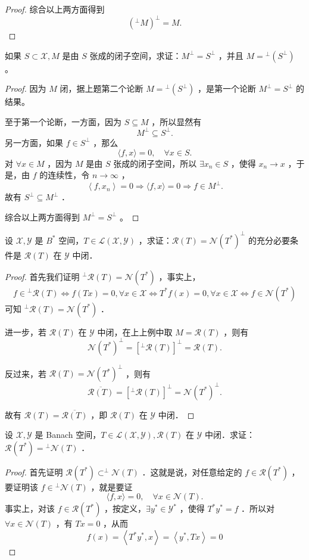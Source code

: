 \documentclass[lang=cn,newtx,10pt,scheme=chinese,thmcnt=chapter]{elegantbook}
\begin{document}
\begin{problemset}
\begin{proof}
综合以上两方面得到
$$
\left({ }^{\perp}M\right)^{\perp} =M .
$$


\end{proof}
\item  如果 $S \subset \mathcal{X}, M$ 是由 $S$ 张成的闭子空间，求证：$M^{\perp}=S^{\perp}$ ，并且 $M={ }^{\perp}\left(S^{\perp}\right)$ 。
\begin{proof}
    因为 $M$ 闭，据上题第二个论断 $M={ }^{\perp}\left(S^{\perp}\right)$ ，是第一个论断 $M^{\perp}=S^{\perp}$ 的结果。

至于第一个论断，一方面，因为 $S \subseteq M$ ，所以显然有
$$
M^{\perp} \subseteq S^{\perp} .
$$
另一方面，如果 $f \in S^{\perp}$ ，那么
$$
\langle f, x\rangle=0, \quad \forall x \in S .
$$
对 $\forall x \in M$ ，因为 $M$ 是由 $S$ 张成的闭子空间，所以 $\exists x_n \in S$ ，使得 $x_n \rightarrow x$ ，于是，由 $f$ 的连续性，令 $n \rightarrow \infty$ ，
$$
\left\langle f, x_n\right\rangle=0 \Longrightarrow\langle f, x\rangle=0 \Longrightarrow f \in M^{\perp} .
$$
故有 $S^{\perp} \subseteq M^{\perp}$ ．

综合以上两方面得到 $M^{\perp}=S^{\perp}$ 。
\end{proof}
\item 设 $\mathcal{X}, \mathcal{Y}$ 是 $B^*$ 空间，$T \in \mathcal{L}(\mathcal{X}, \mathcal{Y})$ ，求证：$\mathcal{R}(T)= \mathcal{N}\left(T^*\right)^{\perp}$ 的充分必要条件是 $\mathcal{R}(T)$ 在 $\mathcal{Y}$ 中闭．
\begin{proof}
    首先我们证明 ${ }^{\perp} \mathcal{R}(T)=\mathcal{N}\left(T^*\right)$ ，事实上，
\[f\in {}^\perp \mathcal{R}(T)\Leftrightarrow f (Tx)=0,\forall x\in \mathcal{X}\Leftrightarrow T^*f(x)=0,\forall x\in \mathcal{X}\Leftrightarrow f\in \mathcal{N}(T^*)\]
可知 ${ }^\perp \mathcal{R}(T)=\mathcal{N}\left(T^*\right)$ ．

进一步，若 $\mathcal{R}(T)$ 在 $\mathcal{Y}$ 中闭，在上上例中取 $M=\mathcal{R}(T)$ ，则有
$$
\mathcal{N}\left(T^*\right)^{\perp}=\left[{ }^{\perp} \mathcal{R}(T)\right]^{\perp}=\mathcal{R}(T) .
$$


反过来，若 $\mathcal{R}(T)=\mathcal{N}\left(T^*\right)^{\perp}$ ，则有
$$
\overline{\mathcal{R}(T)}=\left[{ }^{\perp} \mathcal{R}(T)\right]^{\perp}=\mathcal{N}\left(T^*\right)^{\perp} .
$$


故有 $\mathcal{R}(T)=\overline{\mathcal{R}(T)}$ ，即 $\mathcal{R}(T)$ 在 $\mathcal{Y}$ 中闭．
\end{proof}
\item 设 $\mathcal{X}, \mathcal{Y}$ 是 Banach 空间，$T \in \mathcal{L}(\mathcal{X}, \mathcal{Y}), \mathcal{R}(T)$ 在 $\mathcal{Y}$ 中闭．求证：$\mathcal{R}\left(T^*\right)={ }^{\perp} \mathcal{N}(T)$ ．
\begin{proof}
    首先证明 $\mathcal{R}\left(T^*\right) \subset^{\perp} \mathcal{N}(T)$ ．这就是说，对任意给定的 $f \in \mathcal{R}\left(T^*\right)$ ，要证明该 $f \in{ }^{\perp} \mathcal{N}(T)$ ，就是要证
$$
\langle f, x\rangle=0, \quad \forall x \in \mathcal{N}(T) .
$$
事实上，对该 $f \in \mathcal{R}\left(T^*\right)$ ，按定义，$\exists y^* \in \mathcal{Y}^*$ ，使得 $T^* y^*=f$ ．所以对 $\forall x \in \mathcal{N}(T)$ ，有 $T x=0$ ，从而
$$
f(x)=\left\langle T^* y^*, x\right\rangle=\left\langle y^*, T x\right\rangle=0
$$


\end{proof}
\end{problemset}
\end{document}

